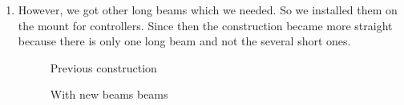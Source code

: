 \begin{enumerate}
\begin{enumerate}
        \item However, we got other long beams which we needed. So we installed them on the mount for controllers. Since then the construction became more straight because there is only one long beam and not the several short ones.
        \begin{figure}[H]
	  	  \begin{minipage}[h]{0.47\linewidth}
	  	    \caption{Previous construction}
	  	  \end{minipage}
	  	  \hfill
	  	  \begin{minipage}[h]{0.47\linewidth}
	  		\caption{With new beams beams}
	  	  \end{minipage}
	   \end{figure}
	   

\end{enumerate}
\end{enumerate}
